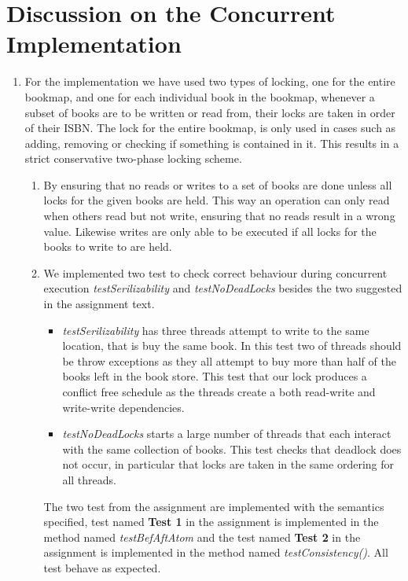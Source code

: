 \documentclass[a4paper]{article}
\begin{document}
\section{Discussion on the Concurrent Implementation}
\begin{enumerate}
  \item For the implementation we have used two types of locking, one for the entire bookmap, and one for each individual book in the bookmap, whenever a subset of books are to be written or read from, their locks are taken in order of their ISBN. The lock for the entire bookmap, is only used in cases such as adding, removing or checking if something is contained in it. This results in a strict conservative two-phase locking scheme.
    \begin{enumerate}
      \item By ensuring that no reads or writes to a set of books are done unless all locks for the given books are held. This way an operation can only read when others read but not write, ensuring that no reads result in a wrong value. Likewise writes are only able to be executed if all locks for the books to write to are held.
      \item We implemented two test to check correct behaviour during concurrent execution \textit{testSerilizability} and \textit{testNoDeadLocks} besides the two suggested in the assignment text. 
      \begin{itemize}
        \item \textit{testSerilizability} has three threads attempt to write to the same location, that is buy the same book. In this test two of threads should be throw exceptions as they all attempt to buy more than half of the books left in the book store. This test that our lock produces a conflict free schedule as the threads create a both read-write and write-write dependencies.
        \item \textit{testNoDeadLocks} starts a large number of threads that each interact with the same collection of books. This test checks that deadlock does not occur, in particular that locks are taken in the same ordering for all threads.
      \end{itemize}
      The two test from the assignment are implemented with the semantics specified, test named \textbf{Test 1} in the assignment is implemented in the method named \textit{testBefAftAtom} and the test named \textbf{Test 2} in the assignment is implemented in the method named \textit{testConsistency()}. All test behave as expected. 
    \end{enumerate}

\end{enumerate}
\end{document}
